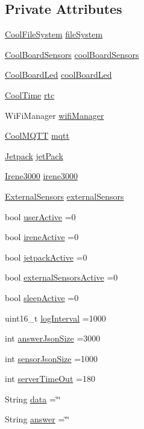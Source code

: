 \subsection*{Private Attributes}
\begin{DoxyCompactItemize}
\item 
\hyperlink{classCoolFileSystem}{Cool\+File\+System} \hyperlink{classCoolBoard_a42c2586fbb13ff7f06538e9284e8538d}{file\+System}
\item 
\hyperlink{classCoolBoardSensors}{Cool\+Board\+Sensors} \hyperlink{classCoolBoard_af102be5288bd7f7a8e59b13f86e26a00}{cool\+Board\+Sensors}
\item 
\hyperlink{classCoolBoardLed}{Cool\+Board\+Led} \hyperlink{classCoolBoard_a1b1d3c684a5baa56b08486e192fd8e97}{cool\+Board\+Led}
\item 
\hyperlink{classCoolTime}{Cool\+Time} \hyperlink{classCoolBoard_a50d2a6716879d64a85f3c6b44ad63275}{rtc}
\item 
Wi\+Fi\+Manager \hyperlink{classCoolBoard_a55b28656e295140928557c47d7fff01e}{wifi\+Manager}
\item 
\hyperlink{classCoolMQTT}{Cool\+M\+Q\+TT} \hyperlink{classCoolBoard_a2399f44d7c23c1149a335cb3b46d90f1}{mqtt}
\item 
\hyperlink{classJetpack}{Jetpack} \hyperlink{classCoolBoard_a30b1357881b01ccbec676856a91e48e9}{jet\+Pack}
\item 
\hyperlink{classIrene3000}{Irene3000} \hyperlink{classCoolBoard_ad103718ce316006c4695b8eb312eaf11}{irene3000}
\item 
\hyperlink{classExternalSensors}{External\+Sensors} \hyperlink{classCoolBoard_a09e26264839c65873eb56af476eff6b2}{external\+Sensors}
\item 
bool \hyperlink{classCoolBoard_a6395459131d6889a3005f79c7a35e964}{user\+Active} =0
\item 
bool \hyperlink{classCoolBoard_a9c3f7ac625481ee2ae802a25d97a4ae0}{irene\+Active} =0
\item 
bool \hyperlink{classCoolBoard_a9be03a913d26e558328935ca3b59a75e}{jetpack\+Active} =0
\item 
bool \hyperlink{classCoolBoard_a638b00b76aeb819ecfd4c10b8cdd7bb7}{external\+Sensors\+Active} =0
\item 
bool \hyperlink{classCoolBoard_a0a51b2287139f66c738101fb53139230}{sleep\+Active} =0
\item 
uint16\+\_\+t \hyperlink{classCoolBoard_a4de0096d575d66b472c4c1f0111fd452}{log\+Interval} =1000
\item 
int \hyperlink{classCoolBoard_af2da1f85315b3d074a8b87d158094fb7}{answer\+Json\+Size} =3000
\item 
int \hyperlink{classCoolBoard_a58e4b6072e3ac8b141ec0befb479208e}{sensor\+Json\+Size} =1000
\item 
int \hyperlink{classCoolBoard_a7a8d8d3d316220cdd049cd63c1aa8fe6}{server\+Time\+Out} =180
\item 
String \hyperlink{classCoolBoard_a427fb753dd8575bdf821c70a5c63d695}{data} =\char`\"{}\char`\"{}
\item 
String \hyperlink{classCoolBoard_a7b835fafd449e5282f7f91d787a2dc15}{answer} =\char`\"{}\char`\"{}
\end{DoxyCompactItemize}


